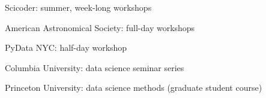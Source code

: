 \documentclass[letterpaper,12pt]{deedy-resume}
\begin{document}
\begin{minipage}[t]{0.64\textwidth}



\begin{tightitemize}
    \item Scicoder: summer, week-long workshops
    \item American Astronomical Society: full-day workshops
    \item PyData NYC: half-day workshop
    \item Columbia University: data science seminar series
    \item Princeton University: data science methods (graduate student course)
\end{tightitemize}







\end{minipage} %



\end{document}
